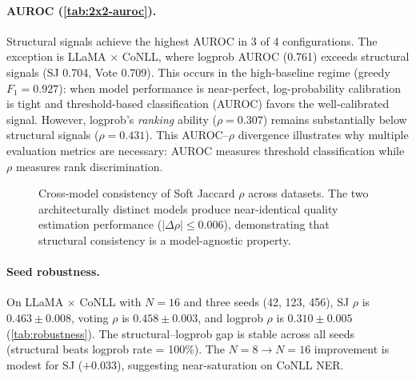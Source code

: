 \documentclass[11pt]{article}
\begin{document}
\paragraph{AUROC (\cref{tab:2x2-auroc}).}
Structural signals achieve the highest AUROC in 3 of 4 configurations.
The exception is LLaMA $\times$ CoNLL, where logprob AUROC (0.761) exceeds structural signals (SJ 0.704, Vote 0.709).
This occurs in the high-baseline regime (greedy $F_1{=}0.927$): when model performance is near-perfect, log-probability calibration is tight and threshold-based classification (AUROC) favors the well-calibrated signal.
However, logprob's \emph{ranking} ability ($\rho{=}0.307$) remains substantially below structural signals ($\rho{=}0.431$).
This AUROC--$\rho$ divergence illustrates why multiple evaluation metrics are necessary: AUROC measures threshold classification while $\rho$ measures rank discrimination.

\begin{figure}[t]
\centering
{}
\caption{Cross-model consistency of Soft Jaccard $\rho$ across datasets. The two architecturally distinct models produce near-identical quality estimation performance ($|\Delta\rho| \le 0.006$), demonstrating that structural consistency is a model-agnostic property.}
\label{fig:cross-model}
\end{figure}

\paragraph{Seed robustness.}
On LLaMA $\times$ CoNLL with $N{=}16$ and three seeds (42, 123, 456), SJ $\rho$ is $0.463 \pm 0.008$, voting $\rho$ is $0.458 \pm 0.003$, and logprob $\rho$ is $0.310 \pm 0.005$ (\cref{tab:robustness}).
The structural--logprob gap is stable across all seeds (structural beats logprob rate = 100\%).
The $N{=}8 \to N{=}16$ improvement is modest for SJ ($+0.033$), suggesting near-saturation on CoNLL NER.
\end{document}
